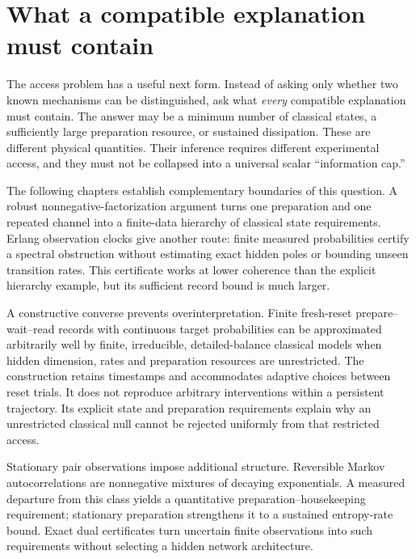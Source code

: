 \chapter{What a compatible explanation must contain}
\label{rf:entry}

The access problem has a useful next form. Instead of asking only whether two
known mechanisms can be distinguished, ask what \emph{every} compatible
explanation must contain. The answer may be a minimum number of classical
states, a sufficiently large preparation resource, or sustained dissipation.
These are different physical quantities. Their inference requires different
experimental access, and they must not be collapsed into a universal scalar
``information cap.''

The following chapters establish complementary boundaries of this question.
A robust nonnegative-factorization argument turns one preparation and one
repeated channel into a finite-data hierarchy of classical state requirements.
Erlang observation clocks give another route: finite measured probabilities
certify a spectral obstruction without estimating exact hidden poles or
bounding unseen transition rates. This certificate works at lower coherence
than the explicit hierarchy example, but its sufficient record bound is much
larger.

A constructive converse prevents overinterpretation. Finite fresh-reset
prepare--wait--read records with continuous target probabilities can be approximated arbitrarily well by finite,
irreducible, detailed-balance classical models when hidden dimension, rates and
preparation resources are unrestricted. The construction retains timestamps
and accommodates adaptive choices between reset trials. It does not reproduce
arbitrary interventions within a persistent trajectory. Its explicit state and
preparation requirements explain why an unrestricted classical null cannot be
rejected uniformly from that restricted access.

Stationary pair observations impose additional structure. Reversible Markov
autocorrelations are nonnegative mixtures of decaying exponentials. A measured
departure from this class yields a quantitative preparation--housekeeping
requirement; stationary preparation strengthens it to a sustained entropy-rate
bound. Exact dual certificates turn uncertain finite observations into such
requirements without selecting a hidden network architecture.

